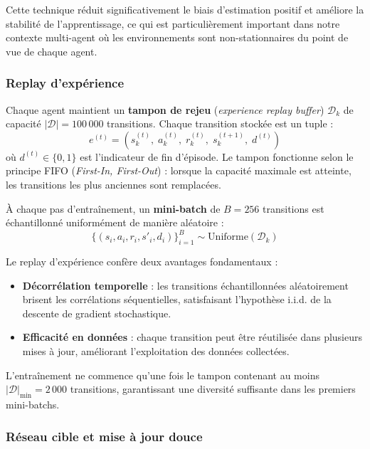 \documentclass[conference]{IEEEtran}
\begin{document}
Cette technique réduit significativement le biais d'estimation positif et améliore la stabilité de l'apprentissage, ce qui est particulièrement important dans notre contexte multi-agent où les environnements sont non-stationnaires du point de vue de chaque agent.

\subsubsection{Replay d'expérience}
\label{sec:experience_replay}

Chaque agent maintient un \textbf{tampon de rejeu} (\textit{experience replay buffer}) $\mathcal{D}_k$ de capacité $|\mathcal{D}| = 100\,000$ transitions. Chaque transition stockée est un tuple :
\begin{equation}
    e^{(t)} = \left(s_k^{(t)},\; a_k^{(t)},\; r_k^{(t)},\; s_k^{(t+1)},\; d^{(t)}\right)
    \label{eq:transition}
\end{equation}
où $d^{(t)} \in \{0, 1\}$ est l'indicateur de fin d'épisode. Le tampon fonctionne selon le principe FIFO (\textit{First-In, First-Out}) : lorsque la capacité maximale est atteinte, les transitions les plus anciennes sont remplacées.

À chaque pas d'entraînement, un \textbf{mini-batch} de $B = 256$ transitions est échantillonné uniformément de manière aléatoire :
\begin{equation}
    \{(s_i, a_i, r_i, s'_i, d_i)\}_{i=1}^{B} \sim \text{Uniforme}(\mathcal{D}_k)
    \label{eq:sampling}
\end{equation}

Le replay d'expérience confère deux avantages fondamentaux :
\begin{itemize}
    \item \textbf{Décorrélation temporelle} : les transitions échantillonnées aléatoirement brisent les corrélations séquentielles, satisfaisant l'hypothèse i.i.d. de la descente de gradient stochastique.
    \item \textbf{Efficacité en données} : chaque transition peut être réutilisée dans plusieurs mises à jour, améliorant l'exploitation des données collectées.
\end{itemize}

L'entraînement ne commence qu'une fois le tampon contenant au moins $|\mathcal{D}|_{\min} = 2\,000$ transitions, garantissant une diversité suffisante dans les premiers mini-batchs.

\subsubsection{Réseau cible et mise à jour douce}
\label{sec:target_network}
\end{document}
